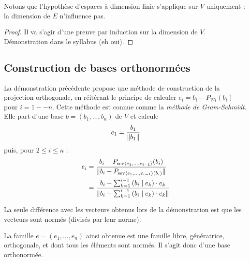 Notons que l'hypothèse d'espaces à dimension finie s'applique sur $V$ uniquement : la dimension de $E$ n'influence pas.

\begin{proof}
Il va s'agir d'une preuve par induction sur la dimension de $V$. Démonstration dans le syllabus (eh oui).
\end{proof}

\subsection{Construction de bases orthonormées}

La démonstration précédente propose une méthode de construction de la projection orthogonale, en réitérant le principe de calculer $e_i = b_i - P_{Wi}(b_i)$ pour $i=1 -- n$. Cette méthode est connue comme la \emph{méthode de Gram-Schmidt}. Elle part d'une base $b = (b_1, \ldots, b_n)$ de $V$ et calcule
\[ e_1 = \frac{b_1}{\| b_1 \|} \]
puis, pour $2 \leq i \leq n$ :
\begin{align*}
e_i &= \frac{b_i - P_{\mathrm{sev} \langle e_1, \ldots, e_{i-1} \rangle }(b_i)}{\| b_i - P_{\mathrm{sev} \langle e_1, \ldots, e_{i-1} \rangle (b_i)} \|} \\
&= \frac{
	b_i - \sum_{k=1}^{i-1} \left( b_i \mid e_k \right) \cdot e_k
}{
	\|  b_i - \sum_{k=1}^{i-1} \left( b_i \mid e_k \right) \cdot e_k  \|
}
\end{align*}

La seule différence avec les vecteurs obtenus lors de la démonstration est que les vecteurs sont normés (divisés par leur norme).

La famille $e=(e_1, \ldots, e_n)$ ainsi obtenue est une famille libre, génératrice, orthogonale, et dont tous les éléments sont normés. Il s'agit donc d'une base orthonormée.

